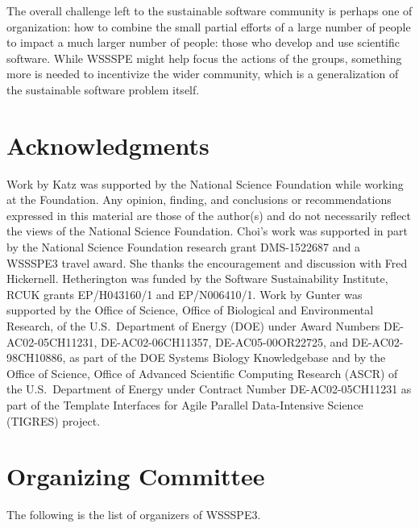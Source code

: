 \documentclass[11pt, oneside]{amsart}
\newcommand{\todo}[1]{{\color{blue}$\blacksquare$~\textsf{[TODO: #1]}}}
\begin{document}
The overall challenge left to the sustainable software community is perhaps one
of organization: how to combine the small partial efforts of a large number of
people to impact a much larger number of people: those who develop and use
scientific software. While WSSSPE might help focus the actions of the groups,
something more is needed to incentivize the wider community, which is a
generalization of the sustainable software problem itself.


\section*{Acknowledgments} \label{sec:acks}

Work by Katz was supported by the National Science Foundation while working at
the Foundation. Any opinion, finding, and conclusions or recommendations
expressed in this material are those of the author(s) and do not necessarily
reflect the views of the National Science Foundation.
%
Choi's work was supported in part by the National Science Foundation research
grant DMS-1522687 and a WSSSPE3 travel award. She thanks the encouragement and
discussion with Fred Hickernell.
%
Hetherington was funded by the Software Sustainability Institute, RCUK grants
EP/H043160/1 and EP/N006410/1.
%
Work by Gunter was supported by the Office of Science, Office of Biological and
Environmental Research, of the U.S.\ Department of Energy (DOE) under Award
Numbers DE-AC02-05CH11231, DE-AC02-06CH11357, DE-AC05-00OR22725, and
DE-AC02-98CH10886, as part of the DOE Systems Biology Knowledgebase and by the
Office of Science, Office of Advanced Scientific Computing Research (ASCR) of
the U.S.\ Department of Energy under Contract Number DE-AC02-05CH11231 as part
of the Template Interfaces for Agile Parallel Data-Intensive Science (TIGRES)
project.
%

\newpage
\appendix
\section{Organizing Committee}  \label{sec:orgcom}

The following is the list of organizers of WSSSPE3.

{\scriptsize
\begin{longtable}{lll}

\end{longtable}
}
 
\end{document}
